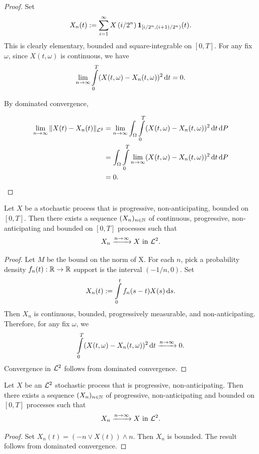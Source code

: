 \begin{proof}
  Set
  \begin{equation}
    X_n(t) := \sum\limits_{i=1}^\infty X\left(i/2^n\right) \mathbf{1}_{[i/2^n, (i+1)/2^n)}(t).
  \end{equation}
  This is clearly elementary, bounded and square-integrable on $[0, T]$. For any fix $\omega$, since $X(t,\omega)$ is continuous, we have
  $$\lim\limits_{n\to\infty}\int\limits_0^T (X(t,\omega) - X_n(t,\omega))^2 \,\mathrm{d} t = 0.$$

  By dominated convergence,

  \begin{align*}
    \lim\limits_{n\to\infty}\|X(t) - X_n(t)\|_{\mathcal{L}^2}
     & = \lim\limits_{n\to\infty}\int_\Omega\int\limits_0^T (X(t,\omega) - X_n(t,\omega))^2 \,\mathrm{d} t \,\mathrm{d} P \\
     & = \int_\Omega\int\limits_0^T \lim\limits_{n\to\infty}(X(t,\omega) - X_n(t,\omega))^2 \,\mathrm{d} t \,\mathrm{d} P \\
     & = 0.
  \end{align*}
\end{proof}

\begin{lemma}
  \label{lemma:approximation-2}
  Let $X$ be a stochastic process that is progressive, non-anticipating, bounded on $[0, T]$. Then there exists a sequence $(X_n)_{n\in\mathbb{N}}$ of continuous, progressive, non-anticipating and bounded on $[0, T]$ processes such that
  $$X_n \xrightarrow{n\to\infty} X \text{ in } \mathcal{L}^2.$$
\end{lemma}
\begin{proof}
  Let $M$ be the bound on the norm of X. For each $n$, pick a probability density $f_n(t):\mathbb{R}\to\mathbb{R}$ support is the interval $(-1/n, 0)$. Set
  $$X_n(t) := \int\limits_0^t f_n(s-t) X(s) \,\mathrm{d} s.$$
  Then $X_n$ is continuous, bounded, progressively measurable, and non-anticipating. Therefore, for any fix $\omega$, we
  $$\int\limits_0^T (X(t,\omega) - X_n(t,\omega))^2 \,\mathrm{d} t \xrightarrow{n\to\infty} 0.$$
  Convergence in $\mathcal{L}^2$ follows from dominated convergence.
\end{proof}


\begin{lemma}
  \label{lemma:approximation-3}
  Let $X$ be an $\mathcal{L}^2$ stochastic process that is progressive, non-anticipating. Then there exists a sequence $(X_n)_{n\in\mathbb{N}}$ of progressive, non-anticipating and bounded on $[0, T]$ processes such that
  $$X_n \xrightarrow{n\to\infty} X \text{ in } \mathcal{L}^2.$$
\end{lemma}
\begin{proof}
  Set $X_n(t) = (-n \vee X(t)) \wedge n$. Then $X_n$ is bounded. The result follows from dominated convergence.
\end{proof}

